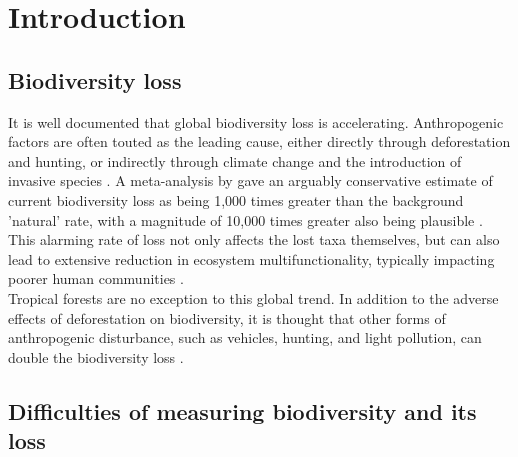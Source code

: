 
\chapter{Introduction} %

\label{Introduction}


\section{Biodiversity loss}

It is well documented that global biodiversity loss is accelerating. Anthropogenic factors are often touted as the leading cause, either directly through deforestation and hunting, or indirectly through climate change and the introduction of invasive species \citep{Chiarucci2011, Doherty2016, Newbold2015}. A meta-analysis by \cite{DeVos2015} gave an arguably conservative estimate of current biodiversity loss as being 1,000 times greater than the background 'natural' rate, with a magnitude of 10,000 times greater also being plausible \citep{Ceballos2015}. This alarming rate of loss not only affects the lost taxa themselves, but can also lead to extensive reduction in ecosystem multifunctionality, typically impacting poorer human communities \citep{Chiarucci2011, Allan2015, Fanin2018, Cardinale2012, Fanin2018}.\\

\noindent Tropical forests are no exception to this global trend. In addition to the adverse effects of deforestation on biodiversity, it is thought that other forms of anthropogenic disturbance, such as vehicles, hunting, and light pollution, can double the biodiversity loss \citep{Barlow2016}.

\section{Difficulties of measuring biodiversity and its loss}

